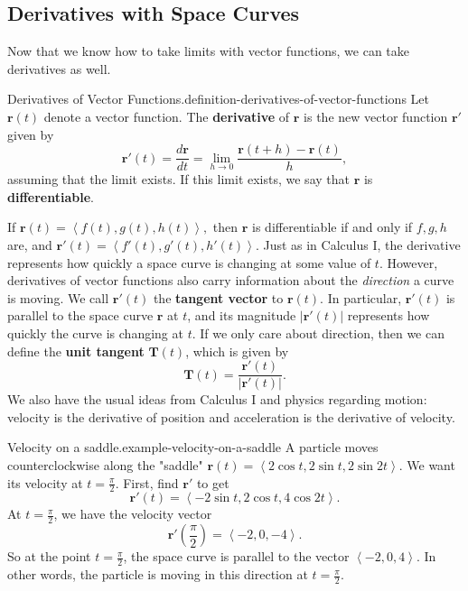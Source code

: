 \documentclass[10pt,]{book}
\newcommand{\terminology}[1]{\textbf{#1}}
\numberwithin{equation}{section}
\newcommand{\vv}[1]{\mathbf{#1}}
\newcommand{\dotprod}[1]{\left\langle #1 \right\rangle}
\begin{document}
\subsection[{Derivatives with Space Curves}]{Derivatives with Space Curves}\label{subsection-derivatives-with-space-curves}
\hypertarget{p-1262}{}%
Now that we know how to take limits with vector functions, we can take derivatives as well.%
\begin{definition}{Derivatives of Vector Functions.}{definition-derivatives-of-vector-functions}%
\hypertarget{p-1263}{}%
Let \(\vv{r}(t)\) denote a vector function. The \terminology{derivative} of \(\vv{r}\) is the new vector function \(\vv{r}'\) given by%
%
\begin{equation*}
\vv{r}'(t) = \frac{d\vv{r}}{dt} = \lim_{h\to0}\frac{\vv{r}(t+h)-\vv{r}(t)}{h},
\end{equation*}
\hypertarget{p-1264}{}%
assuming that the limit exists. If this limit exists, we say that \(\vv{r}\) is \terminology{differentiable}.%
\end{definition}
\hypertarget{p-1265}{}%
If \(\vv{r}(t) = \dotprod{f(t),g(t),h(t)},\) then \(\vv{r}\) is differentiable if and only if \(f,g,h\) are, and \(\vv{r}'(t) = \dotprod{f'(t),g'(t),h'(t)}.\) Just as in Calculus I, the derivative represents how quickly a space curve is changing at some value of \(t\). However, derivatives of vector functions also carry information about the \emph{direction} a curve is moving. We call \(\vv{r}'(t)\) the \terminology{tangent vector} to \(\vv{r}(t)\). In particular, \(\vv{r}'(t)\) is parallel to the space curve \(\vv{r}\) at \(t\), and its magnitude \(|\vv{r}'(t)|\) represents how quickly the curve is changing at \(t\). If we only care about direction, then we can define the \terminology{unit tangent} \(\vv{T}(t)\), which is given by%
%
\begin{equation*}
\vv{T}(t) = \frac{\vv{r}'(t)}{|\vv{r}'(t)|}.
\end{equation*}
\hypertarget{p-1266}{}%
We also have the usual ideas from Calculus I and physics regarding motion: velocity is the derivative of position and acceleration is the derivative of velocity.%
\begin{example}{Velocity on a saddle.}{example-velocity-on-a-saddle}%
\hypertarget{p-1267}{}%
A particle moves counterclockwise along the "saddle" \(\vv{r}(t) = \dotprod{2\cos t, 2\sin t, 2\sin 2t}\). We want its velocity at \(t=\frac{\pi}{2}\). First, find \(\vv{r}'\) to get%
%
\begin{equation*}
\vv{r}'(t) = \dotprod{-2\sin t,2\cos t,4\cos2t}.
\end{equation*}
\hypertarget{p-1268}{}%
At \(t=\frac{\pi}{2}\), we have the velocity vector%
%
\begin{equation*}
\vv{r}'\left(\frac{\pi}{2}\right) = \dotprod{-2,0,-4}.
\end{equation*}
\hypertarget{p-1269}{}%
So at the point \(t=\frac{\pi}{2}\), the space curve is parallel to the vector \(\dotprod{-2,0,4}\). In other words, the particle is moving in this direction at \(t=\frac{\pi}{2}\).%
\end{example}
\end{document}
